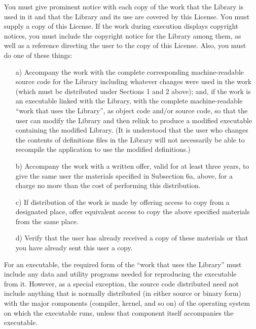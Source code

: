 \begin{multicols}{3}
\begin{itemize}
   You must give prominent notice with each copy of the work that the
   Library is used in it and that the Library and its use are covered by
   this License. You must supply a copy of this License. If the work during
   execution displays copyright notices, you must include the copyright
   notice for the Library among them, as well as a reference directing the
   user to the copy of this License. Also, you must do one of these things:

   \begin{itemize}
   \item[a)] Accompany the work with the complete corresponding
     machine-readable source code for the Library including whatever
     changes were used in the work (which must be distributed under
     Sections 1 and 2 above); and, if the work is an executable linked
     with the Library, with the complete machine-readable ``work that
     uses the Library'', as object code and/or source code, so that
     the user can modify the Library and then relink to produce a
     modified executable containing the modified Library. (It is
     understood that the user who changes the contents of definitions
     files in the Library will not necessarily be able to recompile
     the application to use the modified definitions.)
     
   \item[b)] Accompany the work with a written offer, valid for at
     least three years, to give the same user the materials specified
     in Subsection 6a, above, for a charge no more than the cost of
     performing this distribution.
     
   \item[c)] If distribution of the work is made by offering access to
     copy from a designated place, offer equivalent access to copy the
     above specified materials from the same place.
     
   \item[d)] Verify that the user has already received a copy of these
     materials or that you have already sent this user a copy.
   \end{itemize}

   For an executable, the required form of the ``work that uses the Library''
   must include any data and utility programs needed for reproducing the
   executable from it.  However, as a special exception, the source code
   distributed need not include anything that is normally distributed (in
   either source or binary form) with the major components (compiler,
   kernel, and so on) of the operating system on which the executable runs,
   unless that component itself accompanies the executable.


\end{itemize}
\end{multicols}
